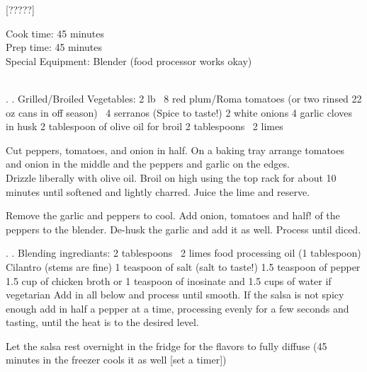 \documentclass{article}
\makeatletter
\newif\if@mainmatter \@mainmattertrue
\newcommand\frontmatter{%
    \cleardoublepage
  \@mainmatterfalse
  \pagenumbering{roman}}
\newcommand\mainmatter{%
    \cleardoublepage
  \@mainmattertrue
  \pagenumbering{arabic}}
\newcommand{\serves}[2][Serves]{%
    \chead{#1 #2}}
\newcommand{\dishtype}[1]{%
    \rhead{#1}%
}
\newcommand{\dishother}[1]{%
    \lhead{#1}%
}
\newcommand{\glutenfree}{%
    {\large\color{gfcolor}\textbf{GF}}%
}
\newcommand{\dessert}{%
    {\large\color{dessertcolor}\textbf{D}}%
}
\newcommand{\preptime}[2][Prep time]{%
    \lfoot{#1: #2}%
}
\newcommand{\cooktime}[2][Cook time]{%
    \rfoot{#1: #2}%
}
\makeatother
\begin{document}
\frontmatter
\tableofcontents

\mainmatter

[?????]
\dishtype{\dessert}
\dishother{\glutenfree}

Cook time: 45 minutes \\
Prep time: 45 minutes \\
Special Equipment:  Blender (food processor works okay) \\\\

\begin{step}
. . Grilled/Broiled Vegetables:
2 lb ~8 red plum/Roma tomatoes (or two rinsed 22 oz cans in off season)
~4 serranos (Spice to taste!)
2 white onions
4 garlic cloves in husk
2 tablespoon of olive oil for broil 
2 tablespoons ~2 limes



\method
Cut peppers, tomatoes, and onion in half.
On a baking tray arrange tomatoes and onion in the middle and the peppers and garlic on the edges.
\\
Drizzle liberally with olive oil.
Broil on high using the top rack for about 10 minutes until softened and lightly charred.
Juice the lime and reserve.

Remove the garlic and peppers to cool. 
Add onion, tomatoes and half! of the peppers to the blender.
De-husk the garlic and add it as well.
Process until diced.
\end{step}

\begin{step}
. . Blending ingrediants:
2 tablespoons ~2 limes
food processing oil (1 tablespoon)
Cilantro (stems are fine)
1 teaspoon of salt (salt to taste!)
1.5 teaspoon of pepper
1.5 cup of chicken broth or 1 teaspoon of inosinate and 1.5 cups of water if vegetarian 
\method
Add in all below and process until smooth.
If the salsa is not spicy enough add in half a pepper at a time, processing evenly for a few seconds and tasting, until the heat is to the desired level.

Let the salsa rest overnight in the fridge for the flavors to fully diffuse (45 minutes in the freezer cools it as well [set a timer])
\end{step}
\end{document}
